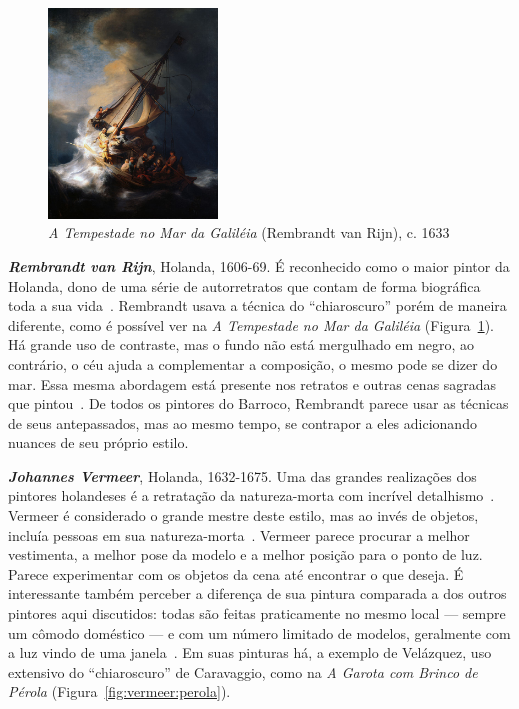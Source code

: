 \begin{figure}
  \begin{center}
    \includegraphics[width=0.4\textwidth]{figs/rembrandt_tempestade.png}
  \end{center}
  \caption{\emph{A Tempestade no Mar da Galiléia} (Rembrandt van Rijn), c. 1633}
  \label{fig:rembrandt:tempestade}
\end{figure}

\textbf{\emph{Rembrandt van Rijn}}, Holanda, 1606-69. É reconhecido
como o maior pintor da Holanda, dono de uma série de autorretratos que
contam de forma biográfica toda a sua vida~\cite{van1999,
  gombrich}. Rembrandt usava a técnica do ``chiaroscuro'' porém de
maneira diferente, como é possível ver na \textit{A Tempestade no Mar
  da Galiléia} (Figura~\ref{fig:rembrandt:tempestade}).  Há grande uso
de contraste, mas o fundo não está mergulhado em negro, ao contrário,
o céu ajuda a complementar a composição, o mesmo pode se dizer do
mar. Essa mesma abordagem está presente nos retratos e outras cenas
sagradas que pintou~\cite{van1997}. De todos os pintores do Barroco,
Rembrandt parece usar as técnicas de seus antepassados, mas ao mesmo
tempo, se contrapor a eles adicionando nuances de seu próprio estilo.

\textbf{\emph{Johannes Vermeer}}, Holanda, 1632-1675. Uma das grandes realizações dos
pintores holandeses é a retratação da natureza-morta com incrível
detalhismo~\cite{wadum}. Vermeer é considerado o grande mestre deste
estilo, mas ao invés de objetos, incluía pessoas em sua
natureza-morta~\cite{gombrich}.  Vermeer parece procurar a melhor
vestimenta, a melhor pose da modelo e a melhor posição para o ponto de
luz. Parece experimentar com os objetos da cena até encontrar o que
deseja. É interessante também perceber a diferença de sua pintura
comparada a dos outros pintores aqui discutidos: todas são feitas
praticamente no mesmo local --- sempre um cômodo doméstico --- e com
um número limitado de modelos, geralmente com a luz vindo de uma
janela~\cite{wadum1998}.  Em suas pinturas há, a exemplo de Velázquez,
uso extensivo do ``chiaroscuro'' de Caravaggio, como na \textit{A
  Garota com Brinco de Pérola} (Figura~\ref{fig:vermeer:perola}).

